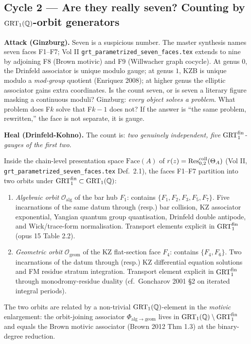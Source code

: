 \subsection*{Cycle 2 --- Are they really seven? Counting by $\mathrm{GRT}_1(\mathbb{Q})$-orbit generators}

\textbf{Attack (Ginzburg).}
Seven is a suspicious number. The master synthesis names seven faces
F1--F7; Vol II \texttt{grt\_parametrized\_seven\_faces.tex} extends to
nine by adjoining F8 (Brown motivic) and F9 (Willwacher graph cocycle).
At genus $0$, the Drinfeld associator is unique modulo gauge; at genus
$1$, KZB is unique modulo a \emph{mod-group} quotient (Enriquez 2008);
at higher genus the elliptic associator gains extra coordinates. Is
the count seven, or is seven a literary figure masking a continuous
moduli? Ginzburg: \emph{every object solves a problem}. What problem
does F$k$ solve that F$k-1$ does not? If the answer is ``the same
problem, rewritten,'' the face is not separate, it is gauge.

\textbf{Heal (Drinfeld-Kohno).}
The count is: \emph{two genuinely independent, five $\mathrm{GRT}_1^{\mathrm{fin}}$-gauges
of the first two}.

\begin{theorem}\ClaimStatusScoped
\label{thm:refined-face-count}
Inside the chain-level presentation space $\mathrm{Face}(A)$ of
$r(z) = \operatorname{Res}^{\mathrm{coll}}_{0,2}(\Theta_A)$ (Vol II,
\texttt{grt\_parametrized\_seven\_faces.tex} Def.\ 2.1), the faces
F1--F7 partition into two orbits under $\mathrm{GRT}_1^{\mathrm{fin}} \subset \mathrm{GRT}_1(\mathbb{Q})$:

\begin{enumerate}
\item \emph{Algebraic orbit} $\mathcal{O}_{\mathrm{alg}}$ of the bar hub
   $F_1$: contains $\{F_1, F_2, F_3, F_5, F_7\}$. Five
   incarnations of the same datum through (resp.) bar collision, KZ
   associator exponential, Yangian quantum group quantisation, Drinfeld
   double antipode, and Wick/trace-form normalisation. Transport
   elements explicit in $\mathrm{GRT}_1^{\mathrm{fin}}$ (opus 15 Table 2.2).

\item \emph{Geometric orbit} $\mathcal{O}_{\mathrm{geom}}$ of the KZ
   flat-section face $F_4$: contains $\{F_4, F_6\}$. Two incarnations
   of the datum through (resp.) KZ differential equation solutions and
   FM residue stratum integration. Transport element explicit in
   $\mathrm{GRT}_1^{\mathrm{fin}}$ through monodromy-residue duality (cf.\ Goncharov 2001 \S2
   on iterated integral periods).
\end{enumerate}

The two orbits are related by a non-trivial $\mathrm{GRT}_1(\mathbb{Q})$-element in the
\emph{motivic} enlargement: the orbit-joining associator
$\Phi_{\mathrm{alg}\to\mathrm{geom}}$ lives in
$\mathrm{GRT}_1(\mathbb{Q}) \setminus \mathrm{GRT}_1^{\mathrm{fin}}$ and equals the Brown motivic associator
(Brown 2012 Thm 1.3) at the binary-degree reduction.
\end{theorem}

